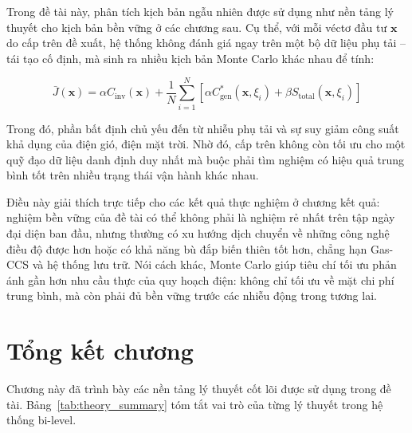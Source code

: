 Trong đề tài này, phân tích kịch bản ngẫu nhiên được sử dụng như nền tảng lý thuyết cho kịch bản bền vững ở các chương sau. Cụ thể, với mỗi véctơ đầu tư $\mathbf{x}$ do cấp trên đề xuất, hệ thống không đánh giá ngay trên một bộ dữ liệu phụ tải -- tái tạo cố định, mà sinh ra nhiều kịch bản Monte Carlo khác nhau để tính:

\begin{equation}
    \bar{J}(\mathbf{x}) = \alpha C_{\text{inv}}(\mathbf{x}) + \frac{1}{N} \sum_{i=1}^{N} \left[ \alpha C_{\text{gen}}^*(\mathbf{x}, \xi_i) + \beta S_{\text{total}}(\mathbf{x}, \xi_i) \right]
\end{equation}

Trong đó, phần bất định chủ yếu đến từ nhiễu phụ tải và sự suy giảm công suất khả dụng của điện gió, điện mặt trời. Nhờ đó, cấp trên không còn tối ưu cho một quỹ đạo dữ liệu danh định duy nhất mà buộc phải tìm nghiệm có hiệu quả trung bình tốt trên nhiều trạng thái vận hành khác nhau.

Điều này giải thích trực tiếp cho các kết quả thực nghiệm ở chương kết quả: nghiệm bền vững của đề tài có thể không phải là nghiệm rẻ nhất trên tập ngày đại diện ban đầu, nhưng thường có xu hướng dịch chuyển về những công nghệ điều độ được hơn hoặc có khả năng bù đắp biến thiên tốt hơn, chẳng hạn Gas-CCS và hệ thống lưu trữ. Nói cách khác, Monte Carlo giúp tiêu chí tối ưu phản ánh gần hơn nhu cầu thực của quy hoạch điện: không chỉ tối ưu về mặt chi phí trung bình, mà còn phải đủ bền vững trước các nhiễu động trong tương lai.

\section{Tổng kết chương}

Chương này đã trình bày các nền tảng lý thuyết cốt lõi được sử dụng trong đề tài. Bảng~\ref{tab:theory_summary} tóm tắt vai trò của từng lý thuyết trong hệ thống bi-level.

